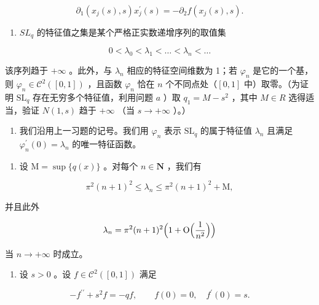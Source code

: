 \[
\partial_ {1} (x _ {j} (s), s) x _ {j} ^ {\prime} (s) = - \partial_ {2} f (x _ {j} (s), s).
\]

\begin{enumerate}
\def\labelenumi{\alph{enumi})}
\setcounter{enumi}{7}
\tightlist
\item
  \(SL_{q}\) 的特征值之集是某个严格正实数递增序列的取值集
\end{enumerate}

\[
0 <   \lambda_ {0} <   \lambda_ {1} <   \dots <   \lambda_ {n} <   \dots
\]

该序列趋于 \(+\infty\) 。此外，与 \(\lambda_{n}\) 相应的特征空间维数为 1；若 \(\varphi_{n}\) 是它的一个基，则 \(\varphi_{n} \in \mathcal{C}^{2}([0,1])\) ，且函数 \(\varphi_{n}\) 恰在 \(n\) 个不同点处（\([0,1]\) 中）取零。（为证明 \(\mathrm{SL}_{q}\) 存在无穷多个特征值，利用问题 \(a\) ）取 \(q_{1} = M - s^{2}\) ，其中 \(M \in R\) 选得适当，验证 \(N(1, s)\) 趋于 \(+\infty\) （当 \(s \to +\infty\) ）。）

\begin{enumerate}
\def\labelenumi{\arabic{enumi})}
\setcounter{enumi}{20}
\tightlist
\item
  我们沿用上一习题的记号。我们用 \(\varphi_{n}\) 表示 \(\mathrm{SL}_{q}\) 的属于特征值 \(\lambda_{n}\) 且满足 \(\varphi_{n}^{\prime}(0)=\lambda_{n}\) 的唯一特征函数。
\end{enumerate}

\begin{enumerate}
\def\labelenumi{\alph{enumi})}
\tightlist
\item
  设 \(\mathrm{M} = \sup \{q(x)\}\) 。对每个 \(n \in \mathbf{N}\) ，我们有
\end{enumerate}

\[
\pi^ {2} (n + 1) ^ {2} \leqslant \lambda_ {n} \leqslant \pi^ {2} (n + 1) ^ {2} + \mathrm{M},
\]

并且此外

\[
\lambda_ {n} = \pi^ {2} (n + 1) ^ {2} \Bigl (1 + \mathrm{O} \Bigl (\frac {1}{n ^ {2}} \Bigr) \Bigr)
\]

当 \(n \rightarrow +\infty\) 时成立。

\begin{enumerate}
\def\labelenumi{\alph{enumi})}
\setcounter{enumi}{1}
\tightlist
\item
  设 \(s > 0\) 。设 \(f \in \mathcal{C}^2([0,1])\) 满足
\end{enumerate}

\[
- f ^ {\prime \prime} + s ^ {2} f = - q f, \qquad f (0) = 0, \quad f ^ {\prime} (0) = s.
\]

